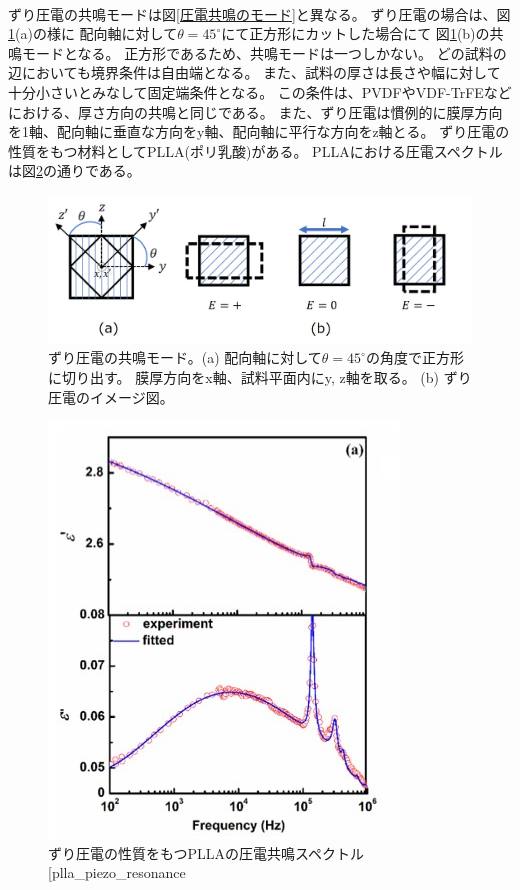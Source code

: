 \documentclass[dvipdfmx,12pt,a4paper]{jreport}
\makeatletter
\DeclareRobustCommand\cite{\unskip
    	\@ifnextchar[{\@tempswatrue\@citex}{\@tempswafalse\@citex[]}}
\makeatother
\begin{document}
			\\
			ずり圧電の共鳴モードは図\ref{圧電共鳴のモード}と異なる。
			ずり圧電の場合は、図\ref{ずり圧電の共鳴モード}(a)の様に
			配向軸に対して$\theta=45^\circ$にて正方形にカットした場合にて
			図\ref{ずり圧電の共鳴モード}(b)の共鳴モードとなる。
			正方形であるため、共鳴モードは一つしかない。
			どの試料の辺においても境界条件は自由端となる。
			また、試料の厚さは長さや幅に対して十分小さいとみなして固定端条件となる。
			この条件は、PVDFやVDF-TrFEなどにおける、厚さ方向の共鳴と同じである。
			また、ずり圧電は慣例的に膜厚方向を1軸、配向軸に垂直な方向をy軸、配向軸に平行な方向をz軸とる。
			ずり圧電の性質をもつ材料としてPLLA(ポリ乳酸)がある。
			PLLAにおける圧電スペクトルは図\ref{PLLA_piezo_resonance}の通りである。
			\begin{figure}[h]
				\centering
				\includegraphics[width=0.8\linewidth]{ずり圧電_共鳴モード.jpg}
				\caption{ずり圧電の共鳴モード。(a) 配向軸に対して$\theta=45^\circ$の角度で正方形に切り出す。
				膜厚方向をx軸、試料平面内にy, z軸を取る。
				(b) ずり圧電のイメージ図。}
				\label{ずり圧電の共鳴モード}
			\end{figure}
			\begin{figure}[h]
				\centering
				\includegraphics{PLLA_圧電共鳴スペクトル.jpg}
				\caption{ずり圧電の性質をもつPLLAの圧電共鳴スペクトル\cite{plla_piezo_resonance}}
				\label{PLLA_piezo_resonance}
			\end{figure}
\end{document}
